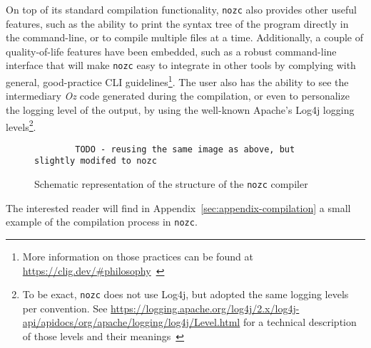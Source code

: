 On top of its standard compilation functionality, \texttt{nozc} also provides other useful features, such as the ability to print the syntax tree of the program directly in the command-line, or to compile multiple files at a time.
Additionally, a couple of quality-of-life features have been embedded, such as a robust command-line interface that will make \texttt{nozc} easy to integrate in other tools by complying with general, good-practice CLI guidelines\footnote{More information on those practices can be found at \url{https://clig.dev/\#philosophy}~\cite{clig}}.
The user also has the ability to see the intermediary \textit{Oz} code generated during the compilation, or even to personalize the logging level of the output, by using the well-known Apache's Log4j logging levels\footnote{To be exact, \texttt{nozc} does not use Log4j, but adopted the same logging levels per convention. See \url{https://logging.apache.org/log4j/2.x/log4j-api/apidocs/org/apache/logging/log4j/Level.html} for a technical description of those levels and their meanings~\cite{log4j}}.\newline
\begin{figure}
    \begin{lstlisting}
        TODO - reusing the same image as above, but slightly modifed to nozc
    \end{lstlisting}
    \caption{Schematic representation of the structure of the \texttt{nozc} compiler}
\end{figure}

The interested reader will find in Appendix~\ref{sec:appendix-compilation} a small example of the compilation process in \texttt{nozc}.

